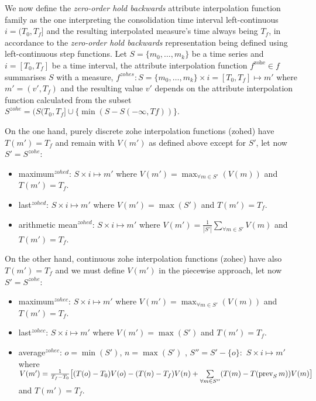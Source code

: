 We now define the \emph{zero-order hold backwards} attribute
interpolation function family as the one interpreting the
consolidation time interval left-continuous $i=(T_0,T_f]$ and the
resulting interpolated measure's time always being $T_f$, in
accordance to the \emph{zero-order hold backwards} representation
being defined using left-continuous step functions.  Let
$S=\{m_0,\ldots,m_k\}$ be a time series and $i=[T_0,T_f]$ be a time
interval, the attribute interpolation function $f^{\text{zohe}}\in f$
summarises $S$ with a measure, $f^{zohes}: S=\{m_0,\ldots,m_k\} \times
i=[T_0,T_f] \mapsto m'$ where $m'=(v',T_f)$ and the resulting value
$v'$ depends on the attribute interpolation function calculated from
the subset $S^{zohe}=(S(T_0,T_f] \cup \{\min(S-S(-\infty,Tf))\}$.

On the one hand, purely discrete zohe interpolation functions (zohed)
have $T(m')=T_f$ and remain with $V(m')$ as defined above except for
$S'$, let now $S'=S^{zohe}$:
\begin{itemize}
\item maximum$^{zohed}$: $S \times i \mapsto m'$ where $V(m') =
  \max_{\forall m \in S'}(V(m))$ and $T(m')=T_f$.
\item last$^{zohed}$: $S \times i \mapsto m'$ where $V(m') = \max(S')$ and
  $T(m')=T_f$.
\item arithmetic mean$^{zohed}$: $S \times i \mapsto m'$ where $V(m')
  = \frac{1}{|S'|} \sum\limits_{\forall m\in S'} V(m)$ and
  $T(m')=T_f$. 
\end{itemize}
On the other hand, continuous zohe interpolation functions (zohec)
have also $T(m')=T_f$ and we must define $V(m')$ in the piecewise
approach, let now $S'=S^{zohe}$:
\begin{itemize}
\item maximum$^{zohec}$: $S \times i \mapsto m'$ where $V(m') =
  \max_{\forall m \in S'}(V(m))$ and $T(m')=T_f$.
\item last$^{zohec}$: $S \times i \mapsto m'$ where $V(m') = \max(S')$
  and $T(m')=T_f$.
\item average$^{zohec}$: $o=\min(S')$, $n=\max(S')$ , $S''= S' -
  \{o\}:$ $S \times i \mapsto m'$ where $V(m') = \frac{1}{T_f-T_0}
  \big[ (T(o)-T_0)V(o) -( T(n)-T_f)V(n) + \sum\limits_{\forall m \in
    S''}( T(m)- T(\operatorname*{prev}_S m) )V(m) \big]$ and $T(m')=T_f$.
\end{itemize}



